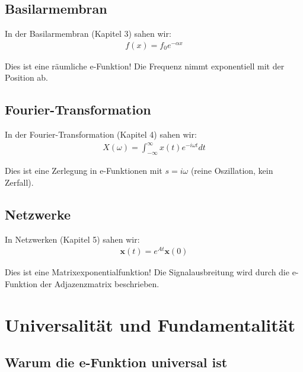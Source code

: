 ﻿\documentclass[a4paper,12pt]{report}
\theoremstyle{definition}
\begin{document}
	\subsection{Basilarmembran}
	
	In der Basilarmembran (Kapitel 3) sahen wir:
	\begin{align}
		f(x) = f_0 e^{-\alpha x}
	\end{align}
	
	Dies ist eine räumliche e-Funktion! Die Frequenz nimmt exponentiell mit der Position ab.
	
	\subsection{Fourier-Transformation}
	
	In der Fourier-Transformation (Kapitel 4) sahen wir:
	\begin{align}
		X(\omega) = \int_{-\infty}^{\infty} x(t) e^{-i\omega t} dt
	\end{align}
	
	Dies ist eine Zerlegung in e-Funktionen mit $s = i\omega$ (reine Oszillation, kein Zerfall).
	
	\subsection{Netzwerke}
	
	In Netzwerken (Kapitel 5) sahen wir:
	\begin{align}
		\mathbf{x}(t) = e^{At} \mathbf{x}(0)
	\end{align}
	
	Dies ist eine Matrixexponentialfunktion! Die Signalausbreitung wird durch die e-Funktion der Adjazenzmatrix beschrieben.
	
	\section{Universalität und Fundamentalität}
	
	\subsection{Warum die e-Funktion universal ist}
	
\end{document}
